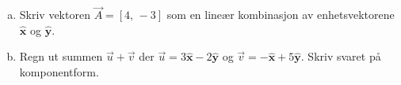 %
\begin{enumerate}[a)]
    \item Skriv vektoren $\vec{A} = [4,\,-3]$ som en lineær kombinasjon av enhetsvektorene $\hat{\mathbf{x}}$ og $\hat{\mathbf{y}}$.
    \item Regn ut summen $\vec{u} + \vec{v}$ der $\vec{u} = 3\hat{\mathbf{x}} - 2\hat{\mathbf{y}}$ og $\vec{v} = -\hat{\mathbf{x}} + 5\hat{\mathbf{y}}$. Skriv svaret på komponentform.
\end{enumerate}
